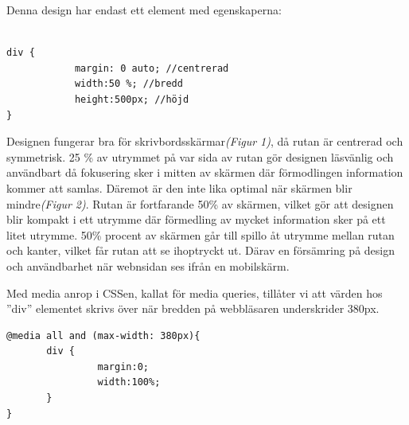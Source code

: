 \documentclass[11pt]{article}
\begin{document}
\vspace{1cm}
Denna design har endast ett element med egenskaperna:

\vspace{0.5cm}
\begin{verbatim}

div {	
	        margin: 0 auto; //centrerad
	        width:50 %; //bredd
	        height:500px; //höjd
}

\end{verbatim}

Designen fungerar bra för skrivbordsskärmar\textit{(Figur 1)}, då rutan är centrerad och symmetrisk. 25 \% av utrymmet på var sida av rutan gör designen läsvänlig och användbart då fokusering sker i mitten av skärmen där förmodlingen information kommer att samlas. Däremot är den inte lika optimal när skärmen blir mindre\textit{(Figur 2)}. Rutan är fortfarande 50\% av skärmen, vilket gör att  designen blir kompakt i ett utrymme där förmedling av mycket information sker på ett litet utrymme. 50\% procent av skärmen går till spillo åt utrymme mellan rutan och kanter, vilket får rutan att se ihoptryckt ut. Därav en försämring på design och användbarhet när webnsidan ses ifrån en mobilskärm.

Med media anrop i CSSen, kallat för media queries, tillåter vi att värden hos ”div” elementet skrivs över när bredden på webbläsaren underskrider 380px.

\vspace{0.5cm}
\begin{verbatim}
@media all and (max-width: 380px){
       div {
                margin:0;
                width:100%;
       }
}
\end{verbatim}
\vspace{0.5cm}
\end{document}
